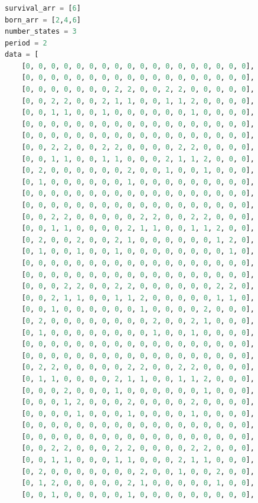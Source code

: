 \documentclass[12pt]{article}
\numberwithin{figure}{section} %
\begin{document}
\subsubsection{}
\begin{lstlisting}[language = Python]
survival_arr = [6]
born_arr = [2,4,6]
number_states = 3
period = 2
data = [
    [0, 0, 0, 0, 0, 0, 0, 0, 0, 0, 0, 0, 0, 0, 0, 0, 0, 0],
    [0, 0, 0, 0, 0, 0, 0, 0, 0, 0, 0, 0, 0, 0, 0, 0, 0, 0],
    [0, 0, 0, 0, 0, 0, 0, 2, 2, 0, 0, 2, 2, 0, 0, 0, 0, 0],
    [0, 0, 2, 2, 0, 0, 2, 1, 1, 0, 0, 1, 1, 2, 0, 0, 0, 0],
    [0, 0, 1, 1, 0, 0, 1, 0, 0, 0, 0, 0, 0, 1, 0, 0, 0, 0],
    [0, 0, 0, 0, 0, 0, 0, 0, 0, 0, 0, 0, 0, 0, 0, 0, 0, 0],
    [0, 0, 0, 0, 0, 0, 0, 0, 0, 0, 0, 0, 0, 0, 0, 0, 0, 0],
    [0, 0, 2, 2, 0, 0, 2, 2, 0, 0, 0, 0, 2, 2, 0, 0, 0, 0],
    [0, 0, 1, 1, 0, 0, 1, 1, 0, 0, 0, 2, 1, 1, 2, 0, 0, 0],
    [0, 2, 0, 0, 0, 0, 0, 0, 2, 0, 0, 1, 0, 0, 1, 0, 0, 0],
    [0, 1, 0, 0, 0, 0, 0, 0, 1, 0, 0, 0, 0, 0, 0, 0, 0, 0],
    [0, 0, 0, 0, 0, 0, 0, 0, 0, 0, 0, 0, 0, 0, 0, 0, 0, 0],
    [0, 0, 0, 0, 0, 0, 0, 0, 0, 0, 0, 0, 0, 0, 0, 0, 0, 0],
    [0, 0, 2, 2, 0, 0, 0, 0, 0, 2, 2, 0, 0, 2, 2, 0, 0, 0],
    [0, 0, 1, 1, 0, 0, 0, 0, 2, 1, 1, 0, 0, 1, 1, 2, 0, 0],
    [0, 2, 0, 0, 2, 0, 0, 2, 1, 0, 0, 0, 0, 0, 0, 1, 2, 0],
    [0, 1, 0, 0, 1, 0, 0, 1, 0, 0, 0, 0, 0, 0, 0, 0, 1, 0],
    [0, 0, 0, 0, 0, 0, 0, 0, 0, 0, 0, 0, 0, 0, 0, 0, 0, 0],
    [0, 0, 0, 0, 0, 0, 0, 0, 0, 0, 0, 0, 0, 0, 0, 0, 0, 0],
    [0, 0, 0, 2, 2, 0, 0, 2, 2, 0, 0, 0, 0, 0, 0, 2, 2, 0],
    [0, 0, 2, 1, 1, 0, 0, 1, 1, 2, 0, 0, 0, 0, 0, 1, 1, 0],
    [0, 0, 1, 0, 0, 0, 0, 0, 0, 1, 0, 0, 0, 0, 2, 0, 0, 0],
    [0, 2, 0, 0, 0, 0, 0, 0, 0, 0, 2, 0, 0, 2, 1, 0, 0, 0],
    [0, 1, 0, 0, 0, 0, 0, 0, 0, 0, 1, 0, 0, 1, 0, 0, 0, 0],
    [0, 0, 0, 0, 0, 0, 0, 0, 0, 0, 0, 0, 0, 0, 0, 0, 0, 0],
    [0, 0, 0, 0, 0, 0, 0, 0, 0, 0, 0, 0, 0, 0, 0, 0, 0, 0],    
    [0, 2, 2, 0, 0, 0, 0, 0, 2, 2, 0, 0, 2, 2, 0, 0, 0, 0],
    [0, 1, 1, 0, 0, 0, 0, 2, 1, 1, 0, 0, 1, 1, 2, 0, 0, 0],
    [0, 0, 0, 2, 0, 0, 0, 1, 0, 0, 0, 0, 0, 0, 1, 0, 0, 0],
    [0, 0, 0, 1, 2, 0, 0, 0, 2, 0, 0, 0, 0, 2, 0, 0, 0, 0],
    [0, 0, 0, 0, 1, 0, 0, 0, 1, 0, 0, 0, 0, 1, 0, 0, 0, 0],
    [0, 0, 0, 0, 0, 0, 0, 0, 0, 0, 0, 0, 0, 0, 0, 0, 0, 0],
    [0, 0, 0, 0, 0, 0, 0, 0, 0, 0, 0, 0, 0, 0, 0, 0, 0, 0],  
    [0, 0, 2, 2, 0, 0, 0, 2, 2, 0, 0, 0, 0, 2, 2, 0, 0, 0],
    [0, 0, 1, 1, 0, 0, 0, 1, 1, 0, 0, 0, 2, 1, 1, 0, 0, 0],
    [0, 2, 0, 0, 0, 0, 0, 0, 0, 2, 0, 0, 1, 0, 0, 2, 0, 0],
    [0, 1, 2, 0, 0, 0, 0, 0, 2, 1, 0, 0, 0, 0, 0, 1, 0, 0],
    [0, 0, 1, 0, 0, 0, 0, 0, 1, 0, 0, 0, 0, 0, 0, 0, 0, 0],

\end{lstlisting}
\end{document}
